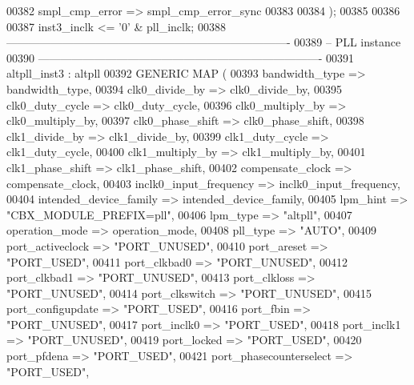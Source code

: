 \begin{DoxyCode}
00382       smpl_cmp_error          => smpl_cmp_error_sync
00383             
00384       \textcolor{vhdlchar}{)};  
00385 
00386        
00387    inst3\_inclk <= '0' & pll\_inclk;
00388 \textcolor{keyword}{----------------------------------------------------------------------------}
00389 \textcolor{keyword}{-- PLL instance}
00390 \textcolor{keyword}{----------------------------------------------------------------------------      }
00391 altpll_inst3 : altpll
00392 \textcolor{keywordflow}{GENERIC} \textcolor{keywordflow}{MAP} (
00393       bandwidth\_type             => bandwidth_type,
00394       clk0\_divide\_by             => clk0_divide_by,
00395       clk0\_duty\_cycle            => clk0_duty_cycle,
00396       clk0\_multiply\_by           => clk0_multiply_by,
00397       clk0\_phase\_shift           => clk0_phase_shift,   
00398       clk1\_divide\_by             => clk1_divide_by,
00399       clk1\_duty\_cycle            => clk1_duty_cycle,
00400       clk1\_multiply\_by           => clk1_multiply_by,
00401       clk1\_phase\_shift           => clk1_phase_shift,
00402       compensate\_clock           => compensate_clock,
00403       inclk0\_input\_frequency     => inclk0_input_frequency,
00404       intended\_device\_family     => intended_device_family,
00405       lpm\_hint                   => \textcolor{keyword}{"CBX\_MODULE\_PREFIX=pll"},
00406       lpm\_type                   => \textcolor{keyword}{"altpll"},
00407       operation\_mode             => operation_mode,
00408       pll\_type                   => \textcolor{keyword}{"AUTO"},
00409       port\_activeclock           => \textcolor{keyword}{"PORT\_UNUSED"},
00410       port\_areset                => \textcolor{keyword}{"PORT\_USED"},
00411       port\_clkbad0               => \textcolor{keyword}{"PORT\_UNUSED"},
00412       port\_clkbad1               => \textcolor{keyword}{"PORT\_UNUSED"},
00413       port\_clkloss               => \textcolor{keyword}{"PORT\_UNUSED"},
00414       port\_clkswitch             => \textcolor{keyword}{"PORT\_UNUSED"},
00415       port\_configupdate          => \textcolor{keyword}{"PORT\_USED"},
00416       port\_fbin                  => \textcolor{keyword}{"PORT\_UNUSED"},
00417       port\_inclk0                => \textcolor{keyword}{"PORT\_USED"},
00418       port\_inclk1                => \textcolor{keyword}{"PORT\_UNUSED"},
00419       port\_locked                => \textcolor{keyword}{"PORT\_USED"},
00420       port\_pfdena                => \textcolor{keyword}{"PORT\_USED"},
00421       port\_phasecounterselect    => \textcolor{keyword}{"PORT\_USED"},

\end{DoxyCode}
